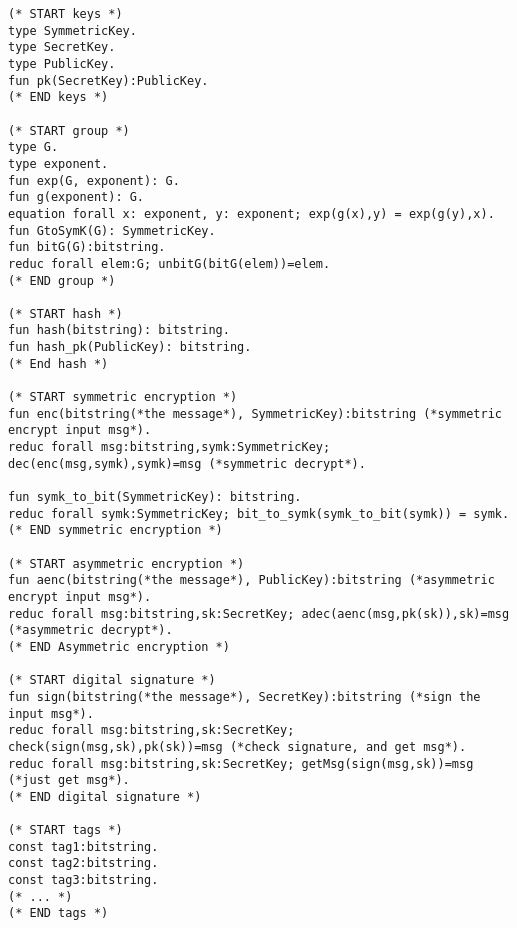 \begin{Verbatim}[fontsize=\small]
(* START keys *)
type SymmetricKey.
type SecretKey.
type PublicKey.
fun pk(SecretKey):PublicKey.
(* END keys *)

(* START group *)
type G.
type exponent.
fun exp(G, exponent): G.
fun g(exponent): G.
equation forall x: exponent, y: exponent; exp(g(x),y) = exp(g(y),x).
fun GtoSymK(G): SymmetricKey.
fun bitG(G):bitstring.
reduc forall elem:G; unbitG(bitG(elem))=elem.
(* END group *)

(* START hash *)
fun hash(bitstring): bitstring.
fun hash_pk(PublicKey): bitstring.
(* End hash *)

(* START symmetric encryption *)
fun enc(bitstring(*the message*), SymmetricKey):bitstring (*symmetric encrypt input msg*).
reduc forall msg:bitstring,symk:SymmetricKey; dec(enc(msg,symk),symk)=msg (*symmetric decrypt*).

fun symk_to_bit(SymmetricKey): bitstring.
reduc forall symk:SymmetricKey; bit_to_symk(symk_to_bit(symk)) = symk.
(* END symmetric encryption *)

(* START asymmetric encryption *)
fun aenc(bitstring(*the message*), PublicKey):bitstring (*asymmetric encrypt input msg*).
reduc forall msg:bitstring,sk:SecretKey; adec(aenc(msg,pk(sk)),sk)=msg (*asymmetric decrypt*).
(* END Asymmetric encryption *)

(* START digital signature *)
fun sign(bitstring(*the message*), SecretKey):bitstring (*sign the input msg*).
reduc forall msg:bitstring,sk:SecretKey; check(sign(msg,sk),pk(sk))=msg (*check signature, and get msg*).
reduc forall msg:bitstring,sk:SecretKey; getMsg(sign(msg,sk))=msg (*just get msg*).
(* END digital signature *)

(* START tags *)
const tag1:bitstring.
const tag2:bitstring.
const tag3:bitstring.
(* ... *)
(* END tags *)

\end{Verbatim}
